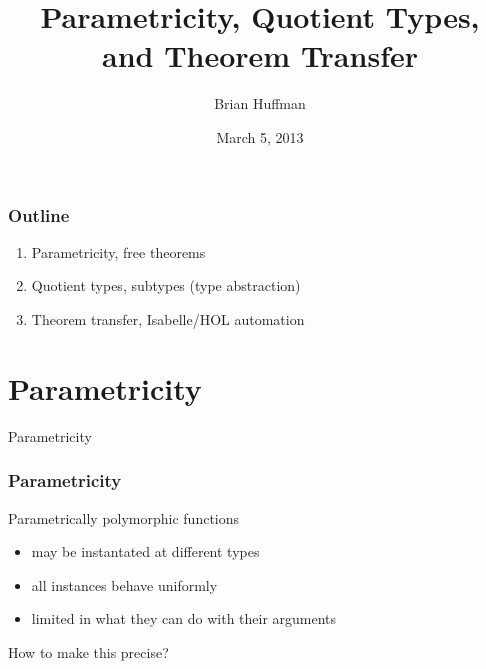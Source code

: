\documentclass[english]{beamer}
\begin{document}
\title{Parametricity, Quotient Types, \\ and Theorem Transfer}
\author{Brian Huffman}
\date{March 5, 2013}

\begin{frame}
\titlepage
\end{frame}


\begin{frame}
\frametitle{Outline}

\begin{large}
\begin{enumerate}[I]
\item Parametricity, free theorems
\medskip
\item Quotient types, subtypes (type abstraction)
\medskip
\item Theorem transfer, Isabelle/HOL automation
\end{enumerate}
\end{large}

\end{frame}

\section{Parametricity}
\begin{frame}
\begin{center}
\huge{Parametricity}
\end{center}
\end{frame}

\begin{frame}
\frametitle{Parametricity}
Parametrically polymorphic functions
\begin{itemize}
\item may be instantated at different types
\item all instances behave uniformly
\item limited in what they can do with their arguments
\end{itemize}
\bigskip
How to make this precise?
\end{frame}
\end{document}
